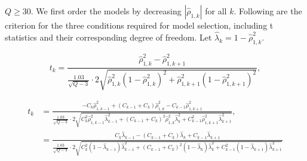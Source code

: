 \begin{theorem} \label{thm:Model_Selection}
$Q\ge 30$. We first order the models by decreasing $|\widehat \rho_{1,k}|$ for all $k$. Following are the criterion for the three conditions required for model selection, including t statistics and their corresponding degree of freedom. Let $\widehat\lambda_k = 1-\widehat\rho_{1,k}^2$.

%
\begin{equation}\label{eq:Conidtion_1_t_test}
    t_k =\frac{\widehat \rho_{1,k}^2-\widehat \rho_{1,k+1}^2}{\frac{1.03}{\sqrt{Q-3}}\cdot 2\sqrt{\widehat \rho_{1,k}^2\left(1-\widehat \rho_{1,k}^2\right)^2 +\widehat \rho_{1,k+1}^2\left(1-\widehat \rho_{1,k+1}^2\right)^2}}, 
\end{equation}
%

\begin{align*}
    t_k&= \frac{-C_{k}\widehat\rho_{1,k-1}^2+(C_{k-1} + C_k)\widehat \rho_{1,k}^2  - C_{k-1}\widehat \rho_{1,k+1}^2}{\frac{1.03}{\sqrt{Q-3}}\cdot 2\sqrt{C_k^2\widehat\rho_{1,k-1}^2\widehat\lambda_{k-1}^2+(C_{k-1} + C_k)^2 \widehat\rho_{1,k}^2 \widehat\lambda_k^2+C_{k-1}^2 \widehat\rho_{1,k+1}^2 \widehat\lambda_{k+1}^2}},\\
    &=\frac{C_k \widehat \lambda_{k-1} - (C_{k-1} + C_k)\widehat \lambda_{k} + C_{k-1} \widehat \lambda_{k+1}}{\frac{1.03}{\sqrt{Q-3}}\cdot 2\sqrt{C_k^2 (1-\widehat\lambda_{k-1})\widehat\lambda_{k-1}^2+(C_{k-1} + C_k)^2 (1-\widehat\lambda_k) \widehat\lambda_k^2+C_{k-1}^2 (1-\widehat\lambda_{k+1})\widehat\lambda_{k+1}^2}}
\end{align*}






\end{theorem}
